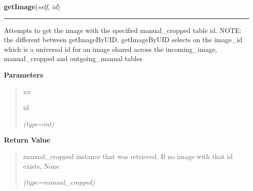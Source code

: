 \hspace{.8\funcindent}\begin{boxedminipage}{\funcwidth}

    \raggedright \textbf{getImage}(\textit{self}, \textit{id})

    \vspace{-1.5ex}

    \rule{\textwidth}{0.5\fboxrule}
\setlength{\parskip}{2ex}
    Attempts to get the image with the specified manual\_cropped table id. 
    NOTE: the different between getImageByUID. getImageByUID selects on the
    image\_id which is a universal id for an image shared across the 
    incoming\_image, manual\_cropped and outgoing\_manual tables

\setlength{\parskip}{1ex}
      \textbf{Parameters}
      \vspace{-1ex}

      \begin{quote}
        \begin{Ventry}{xx}

          \item[id]

            {\it (type=int)}

        \end{Ventry}

      \end{quote}

      \textbf{Return Value}
    \vspace{-1ex}

      \begin{quote}
      manual\_cropped instance that was retrieved. If no image with that id
      exists, None

      {\it (type=manual\_cropped)}

      \end{quote}

    \end{boxedminipage}

    \label{src:dao:manual_cropped_dao:ManualCroppedDAO:getNextImage}

    \vspace{0.5ex}

